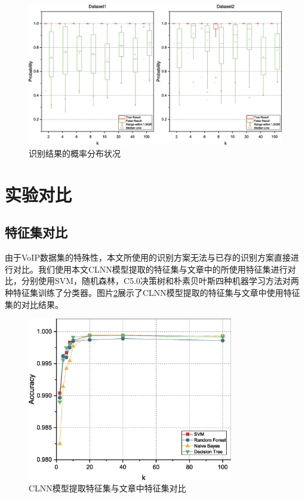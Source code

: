 \begin{figure}[htp]
\begin{center}
\includegraphics[width=1\textwidth]{figures/tf.eps}
\caption{识别结果的概率分布状况}\label{fig:tf}
\end{center}
\end{figure}

\section{实验对比}
\subsection{特征集对比}
由于VoIP数据集的特殊性，本文所使用的识别方案无法与已存的识别方案直接进行对比。我们使用本文CLNN模型提取的特征集与文章\supercite{5}中的所使用特征集进行对比，分别使用SVM，随机森林，C5.0决策树和朴素贝叶斯四种机器学习方法对两种特征集训练了分类器。图片\ref{fig:ml}展示了CLNN模型提取的特征集与文章\supercite{5}中使用特征集的对比结果。
\begin{figure}
  \centering
  \includegraphics[width=0.8\textwidth]{figures/ml.eps}
  \caption{CLNN模型提取特征集与文章\supercite{5}中特征集对比}
  \label{fig:ml}
\end{figure}
